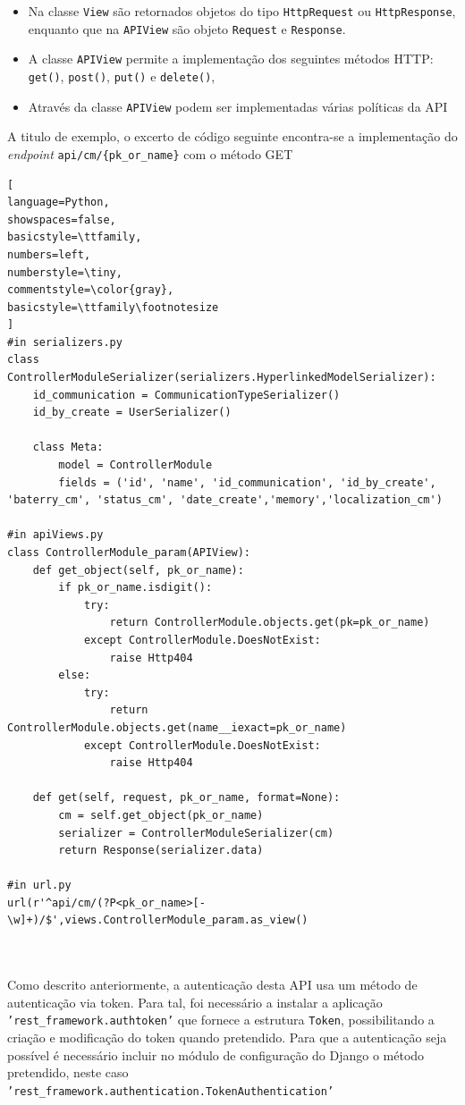 \begin{itemize}
	\item Na classe \texttt{View} são retornados objetos do tipo \texttt{HttpRequest} ou \texttt{HttpResponse}, enquanto que na \texttt{APIView} são objeto \texttt{Request} e \texttt{Response}.
	\item A classe \texttt{APIView} permite a implementação dos seguintes métodos \ac{HTTP}: 	\texttt{get()}, \texttt{post()}, \texttt{put()} e \texttt{delete()},
	\item Através da classe  \texttt{APIView} podem ser implementadas várias políticas da \ac{API} 
\end{itemize}

 
A titulo de exemplo, o excerto de código seguinte encontra-se a implementação do \textit{endpoint} \texttt{api/cm/\{pk\_or\_name\}} com o método GET

\begin{lstlisting}[
language=Python,
showspaces=false,
basicstyle=\ttfamily,
numbers=left,
numberstyle=\tiny,
commentstyle=\color{gray},
basicstyle=\ttfamily\footnotesize
]
#in serializers.py
class ControllerModuleSerializer(serializers.HyperlinkedModelSerializer):
	id_communication = CommunicationTypeSerializer()
	id_by_create = UserSerializer()

	class Meta:
		model = ControllerModule
		fields = ('id', 'name', 'id_communication', 'id_by_create', 'baterry_cm', 'status_cm', 'date_create','memory','localization_cm')

#in apiViews.py 
class ControllerModule_param(APIView):
	def get_object(self, pk_or_name):
		if pk_or_name.isdigit():
			try:
				return ControllerModule.objects.get(pk=pk_or_name)
			except ControllerModule.DoesNotExist:
				raise Http404
		else:
			try:
				return ControllerModule.objects.get(name__iexact=pk_or_name)
			except ControllerModule.DoesNotExist:
				raise Http404
	
	def get(self, request, pk_or_name, format=None):
		cm = self.get_object(pk_or_name)
		serializer = ControllerModuleSerializer(cm)
		return Response(serializer.data)

#in url.py
url(r'^api/cm/(?P<pk_or_name>[-\w]+)/$',views.ControllerModule_param.as_view()



\end{lstlisting}



Como descrito anteriormente, a autenticação desta API usa um método de autenticação via token. Para tal, foi necessário a instalar a aplicação \texttt{'rest\_framework.authtoken'} que fornece a estrutura \texttt{Token}, possibilitando a criação e modificação do token quando pretendido. Para que a autenticação seja possível é necessário incluir no módulo de configuração do Django o método pretendido, neste caso \texttt{'rest\_framework.authentication.TokenAuthentication'}

